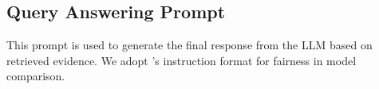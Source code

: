 \documentclass{article} %
\begin{document}






\subsection{Query Answering Prompt}

This prompt is used to generate the final response from the LLM based on retrieved evidence. We adopt \cite{chen2025pathrag}’s instruction format for fairness in model comparison.
\end{document}
